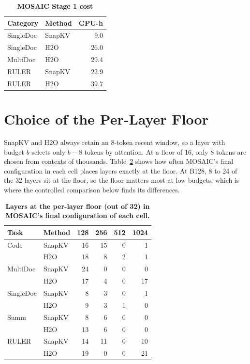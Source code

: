 \begin{table}[H]
  \centering
  \small
  \setlength{\tabcolsep}{12pt}\renewcommand{\arraystretch}{1.2}
  \begin{tabular}{@{}l l r@{}}
    \toprule
    Category & Method & GPU-h \\
    \midrule
    SingleDoc & SnapKV & 9.0 \\
    SingleDoc & H2O & 26.0 \\
    MultiDoc & H2O & 29.4 \\
    RULER & SnapKV & 22.9 \\
    RULER & H2O & 39.7 \\
    \bottomrule
  \end{tabular}
  \caption{\textbf{MOSAIC Stage 1 cost}}
  \label{tab:app-step1}
\end{table}


\section{Choice of the Per-Layer Floor}
\label{app:floor}

SnapKV and H2O always retain an 8-token recent window, so a layer with budget $b$ selects only $b-8$ tokens by attention. At a floor of 16, only 8 tokens are chosen from contexts of thousands. Table~\ref{tab:app-floor} shows how often MOSAIC's final configuration in each cell places layers exactly at the floor. At B128, 8 to 24 of the 32 layers sit at the floor, so the floor matters most at low budgets, which is where the controlled comparison below finds its differences.

\begin{table}[H]
  \centering
  \footnotesize
  \setlength{\tabcolsep}{4pt}
  \begin{tabular}{@{}l l rrrr@{}}
    \toprule
    Task & Method & 128 & 256 & 512 & 1024 \\
    \midrule
    Code & SnapKV & 16 & 15 & 0 & 1 \\
     & H2O & 18 & 8 & 2 & 1 \\
    MultiDoc & SnapKV & 24 & 0 & 0 & 0 \\
     & H2O & 17 & 4 & 0 & 17 \\
    SingleDoc & SnapKV & 8 & 3 & 0 & 1 \\
     & H2O & 9 & 3 & 1 & 0 \\
    Summ & SnapKV & 8 & 6 & 0 & 0 \\
     & H2O & 13 & 6 & 0 & 0 \\
    RULER & SnapKV & 14 & 11 & 0 & 10 \\
     & H2O & 19 & 0 & 0 & 21 \\
    \bottomrule
  \end{tabular}
  \caption{\textbf{Layers at the per-layer floor (out of 32) in MOSAIC's final configuration of each cell.}}
  \label{tab:app-floor}
\end{table}


